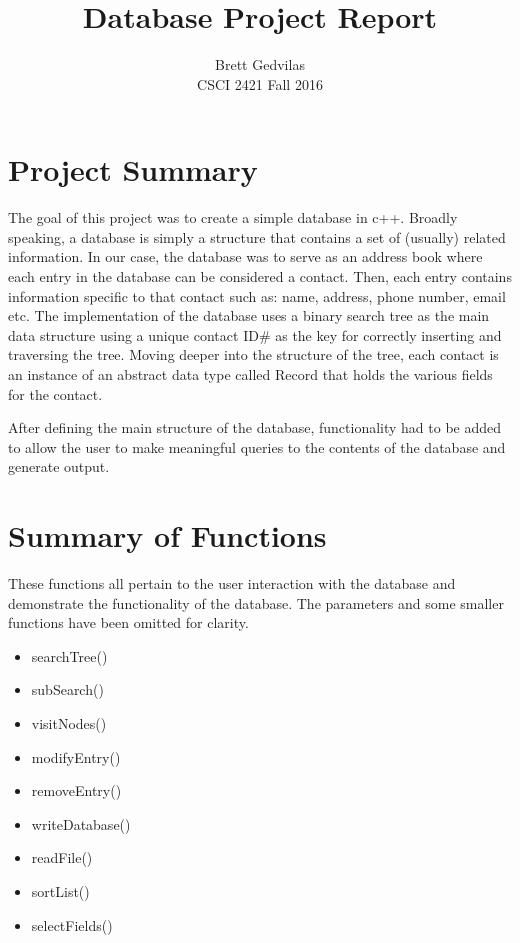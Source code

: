 \documentclass[11pt]{article}
\begin{document}
\title{Database Project Report}
\author{Brett Gedvilas\\CSCI 2421 Fall 2016}
\maketitle

\section*{Project Summary}

The goal of this project was to create a simple database in c++. Broadly speaking, a database is simply a structure that 
contains a set of (usually) related information. In our case, the database was to serve as an address book where each entry 
in the database can be considered a contact. Then, each entry contains information specific to that contact such as: name, 
address, phone number, email etc. The implementation of the database uses a binary search tree as the main data structure 
using a unique contact ID\# as the key for correctly inserting and traversing the tree. Moving deeper into the structure 
of the tree, each contact is an instance of an abstract data type called Record that holds the various fields for the 
contact.

After defining the main structure of the database, functionality had to be added to allow the user to make meaningful 
queries to the contents of the database and generate output.

\newpage



\section*{Summary of Functions}

These functions all pertain to the user interaction with the database and demonstrate the functionality of the database. 
The parameters and some smaller functions have been omitted for clarity.

\begin{itemize}

\item searchTree()
\item subSearch() 
\item visitNodes()
\item modifyEntry()
\item removeEntry()
\item writeDatabase()
\item readFile()
\item sortList()
\item selectFields()



\end{itemize}
\end{document}
